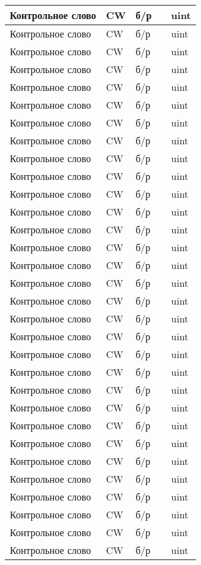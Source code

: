 {\begin{longtable}[c]{| >{\raggedright}m{\wtname} | >{\centering}m{\wtsymbol} | >{\centering}m{\wtunits} | >{\centering}m{\wtbounds} | >{\centering}m{\wtcomment} |}
	Контрольное слово & CW\textunderscore & б/р & \ndash & uint \tabularnewline\hline
	Контрольное слово & CW\textunderscore & б/р & \ndash & uint \tabularnewline\hline
	Контрольное слово & CW\textunderscore & б/р & \ndash & uint \tabularnewline\hline
	Контрольное слово & CW\textunderscore & б/р & \ndash & uint \tabularnewline\hline
	Контрольное слово & CW\textunderscore & б/р & \ndash & uint \tabularnewline\hline	
	Контрольное слово & CW\textunderscore & б/р & \ndash & uint \tabularnewline\hline	
	Контрольное слово & CW\textunderscore & б/р & \ndash & uint \tabularnewline\hline	
	Контрольное слово & CW\textunderscore & б/р & \ndash & uint \tabularnewline\hline	
%
%
	Контрольное слово & CW\textunderscore & б/р & \ndash & uint \tabularnewline\hline	
	Контрольное слово & CW\textunderscore & б/р & \ndash & uint \tabularnewline\hline	
	Контрольное слово & CW\textunderscore & б/р & \ndash & uint \tabularnewline\hline	
	Контрольное слово & CW\textunderscore & б/р & \ndash & uint \tabularnewline\hline	
	Контрольное слово & CW\textunderscore & б/р & \ndash & uint \tabularnewline\hline	
	Контрольное слово & CW\textunderscore & б/р & \ndash & uint \tabularnewline\hline	
	Контрольное слово & CW\textunderscore & б/р & \ndash & uint \tabularnewline\hline	
	Контрольное слово & CW\textunderscore & б/р & \ndash & uint \tabularnewline\hline	
	Контрольное слово & CW\textunderscore & б/р & \ndash & uint \tabularnewline\hline	
	Контрольное слово & CW\textunderscore & б/р & \ndash & uint \tabularnewline\hline	
	Контрольное слово & CW\textunderscore & б/р & \ndash & uint \tabularnewline\hline	
	Контрольное слово & CW\textunderscore & б/р & \ndash & uint \tabularnewline\hline		
	Контрольное слово & CW\textunderscore & б/р & \ndash & uint \tabularnewline\hline		
	Контрольное слово & CW\textunderscore & б/р & \ndash & uint \tabularnewline\hline		
	Контрольное слово & CW\textunderscore & б/р & \ndash & uint \tabularnewline\hline		
	Контрольное слово & CW\textunderscore & б/р & \ndash & uint \tabularnewline\hline		
	Контрольное слово & CW\textunderscore & б/р & \ndash & uint \tabularnewline\hline	
	Контрольное слово & CW\textunderscore & б/р & \ndash & uint \tabularnewline\hline	
	Контрольное слово & CW\textunderscore & б/р & \ndash & uint \tabularnewline\hline	
	Контрольное слово & CW\textunderscore & б/р & \ndash & uint \tabularnewline\hline	
	Контрольное слово & CW\textunderscore & б/р & \ndash & uint \tabularnewline\hline	
	Контрольное слово & CW\textunderscore & б/р & \ndash & uint \tabularnewline\hline	
	Контрольное слово & CW\textunderscore & б/р & \ndash & uint \tabularnewline\hline	

\end{longtable}}
